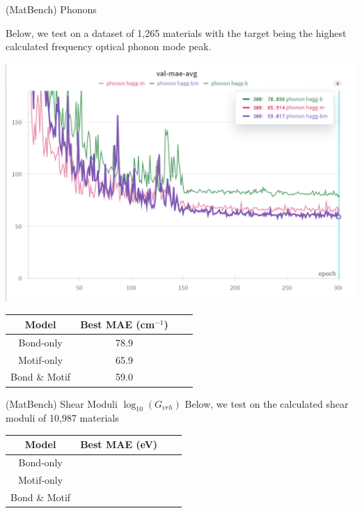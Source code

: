 \documentclass[11pt]{beamer}
\begin{document}
\begin{frame}{(MatBench) Phonons}\small

Below, we test on a dataset of 1,265 materials with the target being the highest calculated frequency optical phonon mode peak.
\begin{center}

\includegraphics[scale=0.4]{phonons.png}

\medskip

\begin{tabular}{c|ccc}
Model & Best MAE (cm$^{-1}$) \\
\hline
Bond-only & 78.9\\
Motif-only & 65.9\\
Bond \& Motif & 59.0\\
\end{tabular}
\end{center}
\end{frame}
\begin{frame}{(MatBench) Shear Moduli $\log_{10}(G_{vrh})$}
\small
Below, we test on the calculated shear moduli of 10,987 materials
\begin{center}


\begin{tabular}{c|ccc}
Model & Best MAE (eV) \\
\hline
Bond-only & \\
Motif-only & \\
Bond \& Motif & \\
\end{tabular}
\end{center}
\end{frame}
\end{document}
